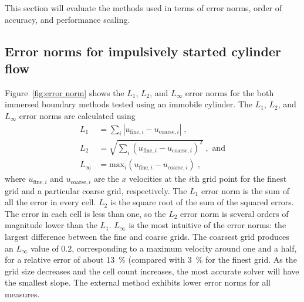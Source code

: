 \documentclass[preprint,12pt]{elsarticle}
\begin{document}
This section will evaluate the methods used in terms of error norms, order of accuracy,
and performance scaling.


\subsection{Error norms for impulsively started cylinder flow}

Figure~\ref{fig:error norm} shows the $L_1$, $L_2$, and $L_\infty$ error norms for
the both immersed boundary methods tested using an immobile cylinder.
The $L_1$, $L_2$, and $L_\infty$ error norms are calculated using
\begin{align}
    L_1 &= \sum_{i} \left|u_{\text{fine}, i}-u_{\text{coarse},i}\right| \;, \label{eq:L1 error norm} \\
    L_2 &= \sqrt{\sum_{i} \left(u_{\text{fine}, i}-u_{\text{coarse},i}\right)^2} \;, \text{ and} \label{eq:L2 error norm} \\
    L_{\infty} &= \text{max}_i\left(u_{\text{fine}, i}-u_{\text{coarse},i}\right) \;, \label{eq:Linf error norm}
\end{align}
where $ u_{\text{fine}, i} $ and $u_{\text{coarse}, i}$ are the $x$ velocities at the $i$th grid point
for the finest grid and a particular coarse grid, respectively.
The $L_1$ error norm is the sum of all the error in every cell.
$L_2$ is the square root of the sum of the squared errors. The error in each cell is less than one,
so the $L_2$ error norm is several orders of magnitude lower than the $L_1$.
$L_\infty$ is the most intuitive of the error norms: the largest difference between the
fine and coarse grids.
The coarsest grid produces an $L_\infty$ value of 0.2, corresponding to a maximum velocity
around one and a half, for a relative error of about \SI{13}{\percent} (compared with
\SI{3}{\percent} for the finest grid. As the grid size decreases and the cell count
increases, the most accurate solver will have the smallest slope.
The external method exhibits lower error norms for all measures.
\end{document}
